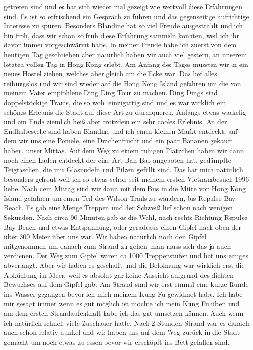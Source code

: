 \documentclass[11pt]{book}
\begin{document}
getreten sind und es hat sich wieder mal gezeigt wie wertvoll diese Erfahrungen sind. Es ist so erfrischend 
ein Gespräch zu führen und das gegenseitige aufrichtige Interesse zu spüren. Besonders Blandine hat so viel 
Freude ausgestrahlt und ich bin froh, dass wir schon so früh diese Erfahrung sammeln konnten, weil ich ihr davon 
immer vorgeschwärmt habe. 
In meiner Freude habe ich zuerst von dem heutigen Tag geschrieben aber natürlich haben wir auch viel gestern, 
an unserem letzten vollen Tag in Hong Kong erlebt. Am Anfang des Tages mussten wir in ein neues Hostel ziehen, 
welches aber gleich um die Ecke war. Das lief alles reibungslos und wir sind wieder auf die Hong Kong Island 
gefahren um die von meinem Vater empfohlene Ding Ding Tour zu machen. Ding Dings sind doppelstöckige Trams, 
die so wohl einzigartig sind und es war wirklich ein schönes Erlebnis die Stadt auf diese Art zu durchqueren.
Anfangs etwas wackelig und am Ende ziemlich heiß aber trotzdem ein sehr cooles Erlebnis. An der Endhaltestelle 
sind haben Blandine und ich einen kleinen Markt entdeckt, auf dem wir uns eine Pomele, eine Drachenfrucht und 
ein paar Bananen gekauft haben, unser Mittag. Auf dem Weg zu einem ruhigen Plätzchen haben wir dann noch einen 
Laden entdeckt der eine Art Ban Bao angeboten hat, gedämpfte Teigtaschen, die mit Glasnudeln und Pilzen gefüllt 
sind. Das hat mich natürlich besonders gefreut weil ich so etwas schon seit meinem ersten Vietnambesuch 1996 
liebe. Nach dem Mittag sind wir dann mit dem Bus in die Mitte von Hong Kong Island gefahren um einen Teil des 
Wilson Trails zu wandern, bis Repulse Bay Beach. Es gab eine Menge Treppen und der Schweiß lief schon nach wenigen 
Sekunden. Nach circa 90 Minuten gab es die Wahl, nach rechts Richtung Repulse Bay Beach und etwas Entspannung, oder 
geradeaus einen Gipfel nach oben der über 300 Meter über uns war. Wir haben natürlich noch den Gipfel mitgenommen 
um danach zum Strand zu gehen, man muss sich das ja auch verdienen. Der Weg zum Gipfel waren ca 1000 Treppenstufen 
und hat uns einiges abverlangt. Aber wir haben es geschafft und die Belohnung war wirklich erst die Abkühlung im 
Meer, weil es absolut gar keine Aussicht aufgrund des dichten Bewuchses auf dem Gipfel gab. Am Strand sind wir 
erst einmal eine kurze Runde ins Wasser gegangen bevor ich mich meinem Kung Fu gewidmet habe. Ich habe mir gesagt 
immer wenn es gut möglich ist möchte ich mein Kung Fu üben und am dem ersten Strandaufenthalt habe ich das gut 
umsetzen können. Auch wenn ich natürlich schnell viele Zuschauer hatte. Nach 2 Stunden Strand war es danach auch 
schon relativ dunkel und wir haben uns auf dem Weg zurück in die Stadt gemacht um noch etwas zu essen bevor 
wir erschöpft ins Bett gefallen sind. 
\end{document}
